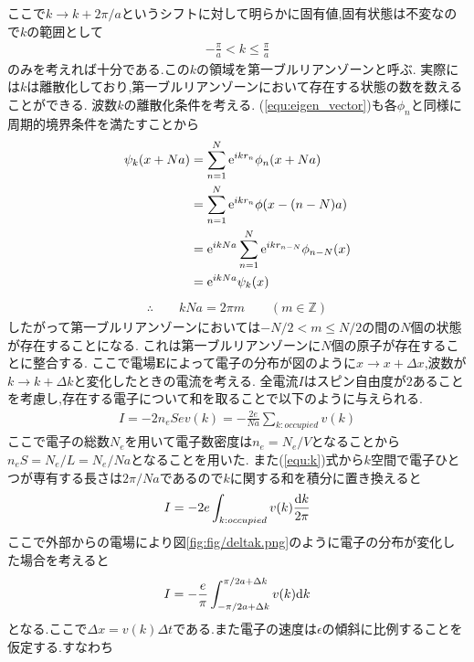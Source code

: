 ここで$k\rightarrow k+2\pi/a$というシフトに対して明らかに固有値,固有状態は不変なので$k$の範囲として
\begin{align}
  -\frac{\pi}{a}<k\leq\frac{\pi}{a}
\end{align}
のみを考えれば十分である.この$k$の領域を第一ブルリアンゾーンと呼ぶ.
実際には$k$は離散化しており,第一ブルリアンゾーンにおいて存在する状態の数を数えることができる.
波数$k$の離散化条件を考える.
(\ref{equ:eigen_vector})も各$\phi_n$と同様に周期的境界条件を満たすことから
\begin{align}
  \begin{split}
    \psi_k(x+Na)&=\sum_{n=1}^N{\rm e}^{ikr_n}\phi_n(x+Na)\\
    &=\sum_{n=1}^N{\rm e}^{ikr_n}\phi(x-(n-N)a)\\
    &={\rm e}^{ikNa}\sum_{n=1}^N{\rm e}^{ikr_{n-N}}\phi_{n-N}(x)\\
    &={\rm e}^{ikNa}\psi_k(x)\\
  \end{split}
\end{align}
\begin{align}
  \label{equ:k}
  \therefore\qquad kNa=2\pi m\qquad(m\in\mathbb{Z})
\end{align}
したがって第一ブルリアンゾーンにおいては$-N/2<m\leq N/2$の間の$N$個の状態が存在することになる.
これは第一ブルリアンゾーンに$N$個の原子が存在することに整合する.
ここで電場$\bm E$によって電子の分布が図のように$x\rightarrow x+\Delta x$,波数が$k\rightarrow k+\Delta k$と変化したときの電流を考える.
全電流$I$はスピン自由度が$2$あることを考慮し,存在する電子について和を取ることで以下のように与えられる.
\begin{align}
  I=-2n_eSev(k)=-\frac{2e}{Na}\sum_{k:occupied}v(k)
\end{align}
ここで電子の総数$N_e$を用いて電子数密度は$n_e=N_e/V$となることから$n_eS=N_e/L=N_e/Na$となることを用いた.
また(\ref{equ:k})式から$k$空間で電子ひとつが専有する長さは$2\pi/Na$であるので$k$に関する和を積分に置き換えると
\begin{align}
  \label{equ:tikan}
  I=-2e\int_{k:occupied}v(k)\frac{{\rm d}k}{2\pi}
\end{align}
ここで外部からの電場により図\ref{fig:fig/deltak.png}のように電子の分布が変化した場合を考えると
\begin{align}
  I=-\frac{e}{\pi}\int_{-\pi/2a+\Delta k}^{\pi/2a+\Delta k}v(k){\rm d}k
\end{align}
となる.ここで$\Delta x=v(k)\Delta t$である.また電子の速度は$\epsilon$の傾斜に比例することを仮定する.すなわち
